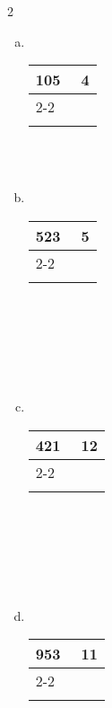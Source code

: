 \documentclass[a4paper,14pt]{article}
\begin{document}
\begin{multicols}{2}
\begin{enumerate}
   			\begin{enumerate}[a)]
   				\item ~ \\
    			\begin{tabular}{ll}
    			\multicolumn{1}{l|}{105} & 4 \\ \cline{2-2} 
    			~                      & ~ \\\\
    			\end{tabular} \\\\
    			\item ~ \\
    			\begin{tabular}{ll}
    				\multicolumn{1}{l|}{523} & 5 \\ \cline{2-2} 
    				~                      & ~ \\\\
    			\end{tabular} \\\\\\\\\\
    			\item ~ \\
    			\begin{tabular}{ll}
    				\multicolumn{1}{l|}{421} & 12 \\ \cline{2-2} 
    				~                      & ~ \\\\
    			\end{tabular} \\\\\\\\\\
    			\item ~ \\
    			\begin{tabular}{ll}
    				\multicolumn{1}{l|}{953} & 11 \\ \cline{2-2} 
    				~                      & ~ \\\\
    			\end{tabular} \\\\\\\\\\
   			\end{enumerate}

\end{enumerate}
\end{multicols}
\end{document}
